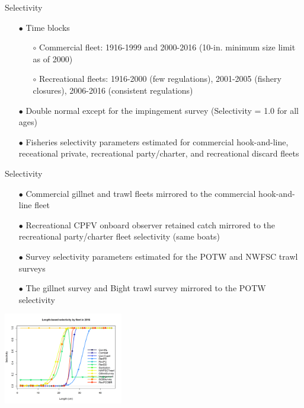 \documentclass[ignorenonframetext,]{beamer}
\begin{document}
\begin{frame}{Selectivity}

\begin{itemize}
\item[$\bullet$] Time blocks
\begin{itemize}
\item[$\circ$] Commercial fleet: 1916-1999 and 2000-2016 (10-in. minimum size limit as of 2000)
\item[$\circ$] Recreational fleets: 1916-2000 (few regulations), 2001-2005 (fishery closures), 2006-2016 (consistent regulations)
\end{itemize}
\item[$\bullet$] Double normal except for the impingement survey (Selectivity = 1.0 for all ages)
\item[$\bullet$] Fisheries selectivity parameters estimated for commercial hook-and-line, receational private, recreational party/charter, and recreational discard fleets
\end{itemize}

\end{frame}

\begin{frame}{Selectivity}

\begin{itemize}
\item[$\bullet$] Commercial gillnet and trawl fleets mirrored to the commercial hook-and-line fleet
\item[$\bullet$] Recreational CPFV onboard observer retained catch mirrored to the recreational party/charter fleet selectivity (same boats)
\item[$\bullet$] Survey selectivity parameters estimated for the POTW and NWFSC trawl surveys
\item[$\bullet$] The gillnet survey and Bight trawl survey mirrored to the POTW selectivity 
\end{itemize}

\centering
\includegraphics[height=4cm]{r4ss/plots_mod1/sel01_multiple_fleets_length1.png}

\end{frame}
\end{document}
